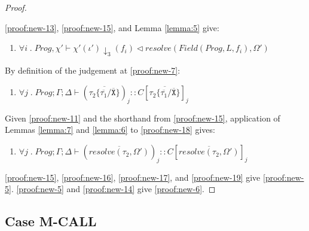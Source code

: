 \begin{proof}
\begin{enumerate}[label=\arabic*), resume]
\end{enumerate}
\ref{proof:new-13}, \ref{proof:new-15}, and Lemma \ref{lemma:5} give:
\begin{enumerate}[label=\arabic*), resume]
    \item \label{proof:new-17} $\forall i \; . \; Prog, \chi' \vdash \chi'(\iota')\downarrow_3(f_i) \triangleleft resolve(Field(Prog, L, f_i), \Omega')$
\end{enumerate}
By definition of the judgement at \ref{proof:new-7}:
\begin{enumerate}[label=\arabic*), resume]
    \item \label{proof:new-18} $\forall j \; . \; Prog; \Gamma; \Delta \vdash (\overline{\tau_2\{\overline{\tau_1}/\overline{\texttt{X}}\}})_j :: C[\overline{\tau_2\{\overline{\tau_1}/\overline{\texttt{X}}\}}]_j$
\end{enumerate}
Given \ref{proof:new-11} and the shorthand from \ref{proof:new-15}, application of Lemmas \ref{lemma:7} and \ref{lemma:6} to \ref{proof:new-18} gives:
\begin{enumerate}[label=\arabic*), resume]
    \item \label{proof:new-19} $\forall j \; . \; Prog; \Gamma; \Delta \vdash (\overline{resolve(\tau_2, \Omega')})_j :: C[\overline{resolve(\tau_2, \Omega')}]_j$
\end{enumerate}
\ref{proof:new-15}, \ref{proof:new-16}, \ref{proof:new-17}, and \ref{proof:new-19} give \ref{proof:new-5}. \ref{proof:new-5} and \ref{proof:new-14} give \ref{proof:new-6}.
\end{proof}

\subsection{Case M-CALL}

